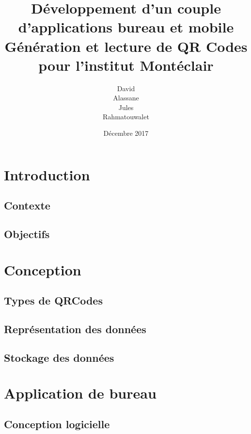 \documentclass{report}
\title{%
		Développement d'un couple d'applications bureau et mobile\\ \large
		Génération et lecture de QR Codes pour l'institut Montéclair}
\author{David \bsc{Dembele}\\ Alassane \bsc{Diop}\\
		Jules \bsc{Leguy}\\ Rahmatouwalet \bsc{Mohamedoun}}
\date{Décembre 2017}
\begin{document}
\maketitle

\tableofcontents

\chapter{Introduction}

	\section{Contexte}
		 \label{contexte}
	
	\section{Objectifs}
		 \label{objectifs}


		
\chapter{Conception}

	\section{Types de QRCodes}
		 \label{typesQR}
		
	\newpage
		
	\section{Représentation des données}
		 \label{representationDonnees}
		
	\section{Stockage des données}
		 \label{stockage}
		

\chapter{Application de bureau}

	\section{Conception logicielle}
		
\end{document}
